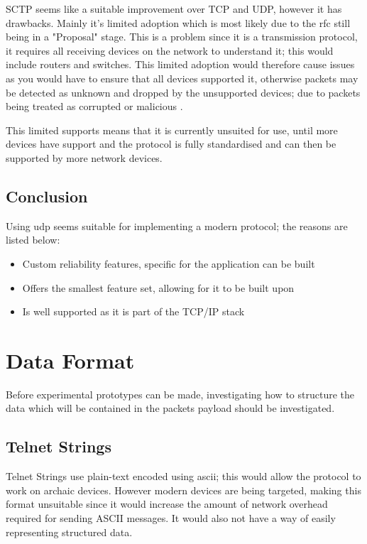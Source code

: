 SCTP seems like a suitable improvement over TCP and UDP, however it has drawbacks. Mainly it's limited adoption which is most likely due to the \acrfull{rfc} still being in a "Proposal" stage. This is a problem since it is a transmission protocol, it requires all receiving devices on the network to understand it; this would include routers and switches. This limited adoption would therefore cause issues as you would have to ensure that all devices supported it, otherwise packets may be detected as unknown and dropped by the unsupported devices; due to packets being treated as corrupted or malicious \parencite{stewart2001sctp}.

This limited supports means that it is currently unsuited for use, until more devices have support and the protocol is fully standardised and can then be supported by more network devices.

\subsection*{Conclusion}
Using \acrshort{udp} seems suitable for implementing a modern protocol; the reasons are listed below:

\begin{itemize}
    \item Custom reliability features, specific for the application can be built
    \item Offers the smallest feature set, allowing for it to be built upon
    \item Is well supported as it is part of the TCP/IP stack
\end{itemize}


\section{Data Format}
Before experimental prototypes can be made, investigating how to structure the data which will be contained in the packets payload should be investigated.

\subsection*{Telnet Strings}
Telnet Strings use plain-text encoded using \acrshort{ascii}; this would allow the protocol to work on archaic devices. However modern devices are being targeted, making this format unsuitable since it would increase the amount of network overhead required for sending ASCII messages. It would also not have a way of easily representing structured data.

